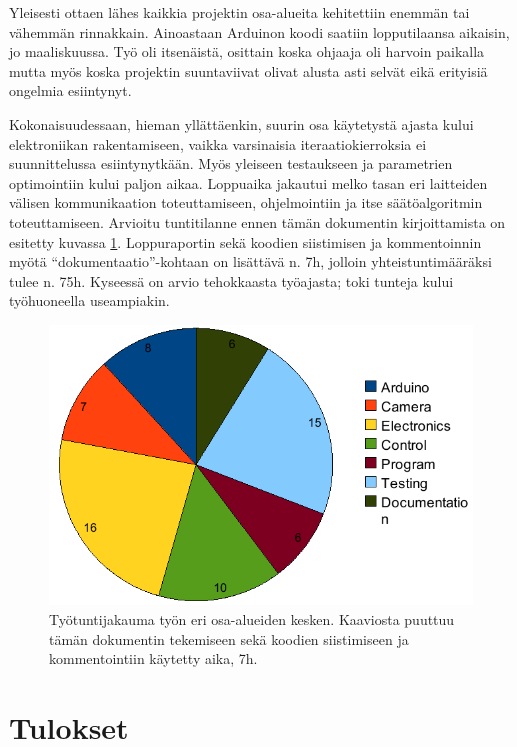 \documentclass[finnish,12pt]{article}
\begin{document}
Yleisesti ottaen lähes kaikkia projektin osa-alueita kehitettiin enemmän tai vähemmän rinnakkain. Ainoastaan Arduinon koodi saatiin lopputilaansa aikaisin, jo maaliskuussa. Työ oli itsenäistä, osittain koska ohjaaja oli harvoin paikalla mutta myös koska projektin suuntaviivat olivat alusta asti selvät eikä erityisiä ongelmia esiintynyt.

Kokonaisuudessaan, hieman yllättäenkin, suurin osa käytetystä ajasta kului elektroniikan rakentamiseen, vaikka varsinaisia iteraatiokierroksia ei suunnittelussa esiintynytkään. Myös yleiseen testaukseen ja parametrien optimointiin kului paljon aikaa. Loppuaika jakautui melko tasan eri laitteiden välisen kommunikaation toteuttamiseen, ohjelmointiin ja itse säätöalgoritmin toteuttamiseen. Arvioitu tuntitilanne ennen tämän dokumentin kirjoittamista on esitetty kuvassa \ref{fig:tuntitilanne}. Loppuraportin sekä koodien siistimisen ja kommentoinnin myötä ``dokumentaatio''-kohtaan on lisättävä n. 7h, jolloin yhteistuntimääräksi tulee n. 75h. Kyseessä on arvio tehokkaasta työajasta; toki tunteja kului työhuoneella useampiakin.

\begin{figure}[h]
 \begin{center}
  \includegraphics[scale=0.5]{kuvat/tuntitilanne.png}
  \caption{Työtuntijakauma työn eri osa-alueiden kesken. Kaaviosta puuttuu tämän dokumentin tekemiseen sekä koodien siistimiseen ja kommentointiin käytetty aika, 7h.}
  \label{fig:tuntitilanne}
 \end{center}
\end{figure}



\section{Tulokset}
\end{document}
